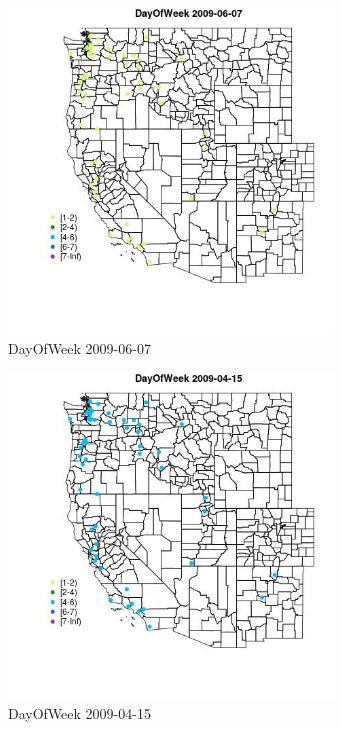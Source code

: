 \begin{figure} 
\centering  
\includegraphics[width=0.77\textwidth]{Code_Outputs/Report_ML_input_PM25_Step4_part_e_de_duplicated_aves_MapObsDayOfWeek2009-06-07.jpg} 
\caption{\label{fig:Report_ML_input_PM25_Step4_part_e_de_duplicated_avesMapObsDayOfWeek2009-06-07}DayOfWeek 2009-06-07} 
\end{figure} 
 

\begin{figure} 
\centering  
\includegraphics[width=0.77\textwidth]{Code_Outputs/Report_ML_input_PM25_Step4_part_e_de_duplicated_aves_MapObsDayOfWeek2009-04-15.jpg} 
\caption{\label{fig:Report_ML_input_PM25_Step4_part_e_de_duplicated_avesMapObsDayOfWeek2009-04-15}DayOfWeek 2009-04-15} 
\end{figure} 
 

